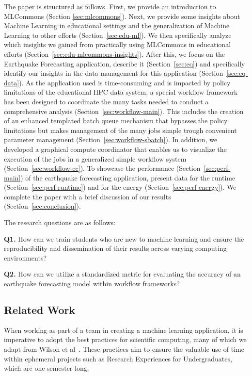 \documentclass[utf8]{FrontiersinVancouver} %
\begin{document}
The paper is structured as follows. First, we provide an introduction to MLCommons (Section \ref{sec:mlcommons}).  Next, we provide some insights about Machine Learning in educational settings and the generalization of Machine Learning to other efforts (Section~\ref{sec:edu-ml}). We then specifically analyze which insights we gained from practically using MLCommons in educational efforts (Section~\ref{sec:edu-mlcommons-insights}). After this, we focus on the Earthquake Forecasting application, describe it (Section~\ref{sec:eq}) and specifically identify our insights in the data management for this application (Section~\ref{sec:eq-data}).  As the application used is time-consuming and is impacted by policy limitations of the educational HPC data system, a special workflow framework has been designed to coordinate the many tasks needed to conduct a comprehensive analysis (Section~\ref{sec:workflow-main}). This includes the creation of an enhanced templated batch queue mechanism that bypasses the policy limitations but makes management of the many jobs simple trough convenient parameter management (Section~\ref{sec:workflow-sbatch}). In addition, we developed a graphical compute coordinator that enables us to visualize the execution of the jobs in a generalized simple workflow system (Section~\ref{sec:workflow-cc}).  To showcase the performance (Section~\ref{sec:perf-main}) of the earthquake forecasting application, present data for the runtime (Section~\ref{sec:perf-runtime}) and for the energy (Section~\ref{sec:perf-energy}). We complete the paper with a brief discussion of our results (Section~\ref{sec:conclusion}).

The research questions are as follows:

{\bf Q1.} How can we train students who are new to machine learning and ensure the reproducibility and dissemination of their results across varying computing environments?

{\bf Q2.} How can we utilize a standardized metric for evaluating the accuracy of an earthquake forecasting model within workflow frameworks?

\subsection{Related Work}
\label{sec:related-work}

When working as part of a team in creating a machine learning application, it is imperative to adopt the best practices for scientific computing, many of which we adapt from Wilson et al~\cite{wilson}. These practices aim to ensure the valuable use of time within ephemeral projects such as Research Experiences for Undergraduates, which are one semester long.
\end{document}

